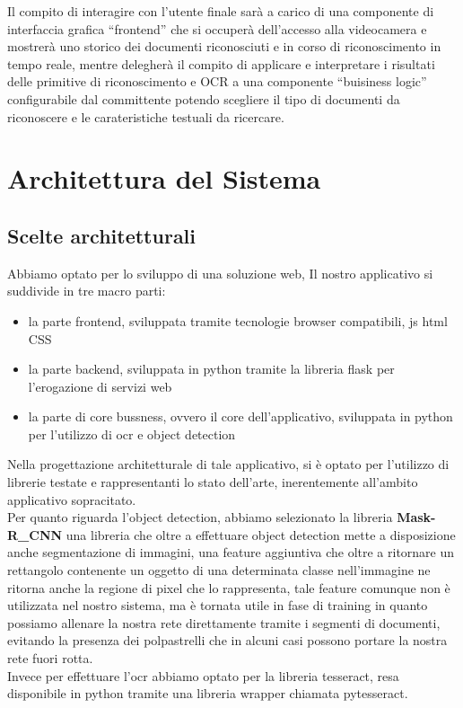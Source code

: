 \documentclass[12pt,a4paper]{article}
\begin{document}
Il compito di interagire con l'utente finale sarà a carico di una
componente di interfaccia grafica ``frontend'' che si occuperà
dell'accesso alla videocamera e mostrerà uno storico dei documenti
riconosciuti e in corso di riconoscimento in tempo reale, mentre
delegherà il compito di applicare e interpretare i risultati delle
primitive di riconoscimento e OCR a una componente ``buisiness logic''
configurabile dal committente potendo scegliere il tipo di documenti da
riconoscere e le carateristiche testuali da ricercare.

\section{Architettura del Sistema}

\subsection{Scelte architetturali}

Abbiamo optato per lo sviluppo di una soluzione web, Il nostro
applicativo si suddivide in tre macro parti:

\begin{itemize}
    \item la parte frontend, sviluppata tramite tecnologie browser
        compatibili, js html CSS
    \item la parte backend, sviluppata in python tramite la libreria
        flask per l'erogazione di servizi web
    \item la parte di core bussness, ovvero il core dell'applicativo,
        sviluppata in python per l'utilizzo di ocr e object
        detection
\end{itemize}

Nella progettazione architetturale di tale applicativo, si è optato per
l'utilizzo di librerie testate e rappresentanti lo stato dell'arte,
inerentemente all'ambito applicativo sopracitato.\\
Per quanto riguarda l'object detection, abbiamo selezionato la libreria
\textbf{Mask-R\_CNN} una libreria che oltre a effettuare object detection mette a
disposizione anche segmentazione di immagini, una feature aggiuntiva che
oltre a ritornare un rettangolo contenente un oggetto di una determinata
classe nell'immagine ne ritorna anche la regione di pixel che lo
rappresenta, tale feature comunque non è utilizzata nel nostro sistema,
ma è tornata utile in fase di training in quanto possiamo allenare la
nostra rete direttamente tramite i segmenti di documenti, evitando la
presenza dei polpastrelli che in alcuni casi possono portare la nostra
rete fuori rotta.\\
Invece per effettuare l'ocr abbiamo optato per la libreria tesseract,
resa disponibile in python tramite una libreria wrapper chiamata
pytesseract.
\end{document}
